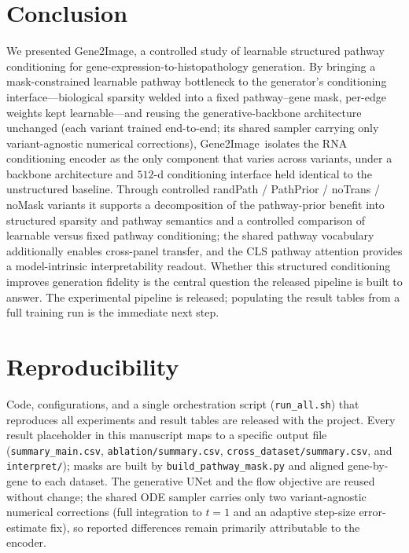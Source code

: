 \documentclass[journal]{IEEEtran}
\newcommand{\method}{Gene2Image}
\begin{document}
\section{Conclusion}
We presented \method, a controlled study of learnable structured pathway
conditioning for gene-expression-to-histopathology generation. By bringing a
mask-constrained learnable pathway bottleneck to the generator's conditioning
interface---biological sparsity welded into a fixed pathway--gene mask, per-edge
weights kept learnable---and reusing the generative-backbone architecture unchanged
(each variant trained end-to-end; its shared sampler carrying only variant-agnostic
numerical corrections), \method\ isolates the RNA conditioning encoder as the only
component that varies across variants, under a backbone architecture and
$512$-d conditioning interface held identical to the unstructured baseline. Through controlled randPath /
PathPrior / noTrans / noMask variants it supports a decomposition of the
pathway-prior benefit into structured sparsity and pathway semantics and a
controlled comparison of learnable versus fixed pathway conditioning; the shared
pathway vocabulary additionally enables cross-panel transfer, and the CLS pathway
attention provides a model-intrinsic interpretability readout. Whether this
structured conditioning improves generation fidelity is the central question the
released pipeline is built to answer. The experimental pipeline is released;
populating the result tables from a full training run is the immediate next step.

\section*{Reproducibility}
Code, configurations, and a single orchestration script (\texttt{run\_all.sh})
that reproduces all experiments and result tables are released with the project.
Every result placeholder in this manuscript maps to a specific output file
(\texttt{summary\_main.csv}, \texttt{ablation/summary.csv},
\texttt{cross\_dataset/summary.csv}, and \texttt{interpret/}); masks are built by
\texttt{build\_pathway\_mask.py} and aligned gene-by-gene to each dataset. The
generative UNet and the flow objective are reused without change; the shared ODE
sampler carries only two variant-agnostic numerical corrections (full integration
to $t{=}1$ and an adaptive step-size error-estimate fix), so reported differences
remain primarily attributable to the encoder.



\end{document}

